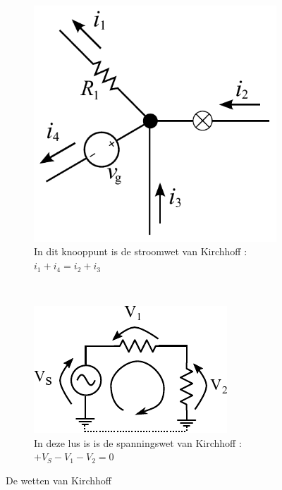 \documentclass{article}
\begin{document}
			\begin{figure}[htbp!]
				\centering
				\begin{subfigure}[b]{0.45\linewidth}
					\centering
					\includegraphics[scale=0.5]{kcl.pdf}
					\caption{In dit knooppunt is de stroomwet van Kirchhoff : $i_1 + i_4 = i_2+i_3$}
					\label{subfig:kcl}
				\end{subfigure}
				~
				\begin{subfigure}[b]{0.45\linewidth}
					\centering
					\includegraphics{kvl.pdf}
					\caption{In deze lus is is de spanningswet van Kirchhoff : $ + V_S - V_1 - V_2 = 0$}
					\label{subfig:kvl}
				\end{subfigure}
			\caption{De wetten van Kirchhoff}
			\label{fig:kirchoff}
			\end{figure}

\end{document}
